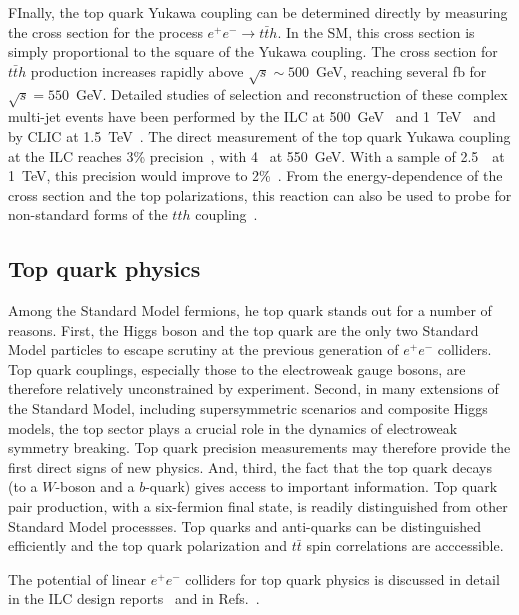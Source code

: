  FInally, the top quark Yukawa coupling can be determined directly by
 measuring the cross section for the process
$e^+e^- \rightarrow t\bar{t}h$.  In the SM, this cross section is simply
proportional to the square of the Yukawa coupling.   The cross section for $t\bar{t}h$ production increases rapidly above $\sqrt{s} \sim 500 $~GeV,
reaching several fb for $\sqrt{s} = 550$~GeV. Detailed studies of selection and reconstruction of these complex multi-jet events
have been performed by the ILC at 500~GeV~\cite{Yonamine:2011jg} and
 1~TeV~\cite{Behnke:2013lya,Price:2014oca} and by CLIC
at 1.5~TeV~\cite{Abramowicz:2018rjq}. The direct measurement of the top quark Yukawa coupling at the ILC reaches 3\%
precision~\cite{Fujii:2015jha}, with 4~\iab{} at 550~GeV.  With a sample of
2.5~\iab\  at 
1~TeV, this precision would improve to 2\%~\cite{Asner:2013psa}.  From
the energy-dependence of the cross section and the top polarizations,
this reaction can also be used to probe for non-standard forms of the
$tth$ coupling~\cite{Han:1999xd}.




\subsection{Top quark physics}
\label{subsec:highE:top}

Among the Standard Model fermions, he top quark stands out for a number of reasons. First, the Higgs boson
and the top quark are the only two Standard Model particles to escape scrutiny at the previous generation
of $e^+e^-$ colliders. Top quark couplings, especially those to the electroweak gauge bosons, are therefore
relatively unconstrained by experiment. Second, in many extensions of the Standard Model, including
supersymmetric scenarios and composite Higgs models, the top sector plays a crucial role in the dynamics
of electroweak symmetry breaking. Top quark precision measurements may therefore provide the first direct signs of new physics.
And, third, the fact that the top quark decays (to a $W$-boson and a $b$-quark) gives access to important information. Top quark
pair production, with a six-fermion final state, is readily distinguished from other Standard Model processses. Top quarks
and anti-quarks can be distinguished efficiently and the top quark polarization and $t\bar{t}$ spin correlations are acccessible. 

The potential of linear $e^+e^-$ colliders for top quark physics is discussed in detail in the ILC design reports~\cite{}
and in Refs.~\cite{Agashe:2013hma,Vos:2016til,Abramowicz:2018rjq}.




